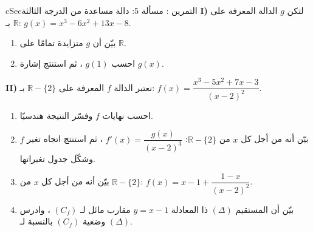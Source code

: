 \documentclass[12pt,a4paper]{article}
\newenvironment{BOX}[2]{\begin{otherlanguage}{english}\begin{arbox}{#1}{#2}}{\end{arbox}\end{otherlanguage}}
\newcounter{exo}
\newenvironment{tamrin}[1]{\stepcounter{exo}\begin{BOX}{cSec}{التمرين \theexo: #1}}{\end{BOX}}
\newcommand{\R}{\mathbb{R}}
\begin{document}
\begin{tamrin}{مسألة 5: دالة مساعدة من الدرجة الثالثة}
\textbf{I)} لتكن $g$ الدالة المعرفة على $\R$ بـ: $g(x)=x^3-6x^2+13x-8$.
\begin{enumerate}
\item بيّن أن $g$ متزايدة تمامًا على $\R$.
\item احسب $g(1)$ ، ثم استنتج إشارة $g(x)$.
\end{enumerate}
\textbf{II)} نعتبر الدالة $f$ المعرفة على $\R-\{2\}$ بـ: $f(x)=\dfrac{x^3-5x^2+7x-3}{(x-2)^2}$.
\begin{enumerate}[resume]
\item احسب نهايات $f$ وفسّر النتيجة هندسيًا.
\item بيّن أنه من أجل كل $x$ من $\R-\{2\}$: $f'(x)=\dfrac{g(x)}{(x-2)^3}$ ، ثم استنتج اتجاه تغير $f$ وشكّل جدول تغيراتها.
\item بيّن أنه من أجل كل $x$ من $\R-\{2\}$: $f(x)=x-1+\dfrac{1-x}{(x-2)^2}$.
\item بيّن أن المستقيم $(\Delta)$ ذا المعادلة $y=x-1$ مقارب مائل لـ $(C_f)$ ، وادرس وضعية $(C_f)$ بالنسبة لـ $(\Delta)$.
\end{enumerate}
\end{tamrin}
\end{document}
